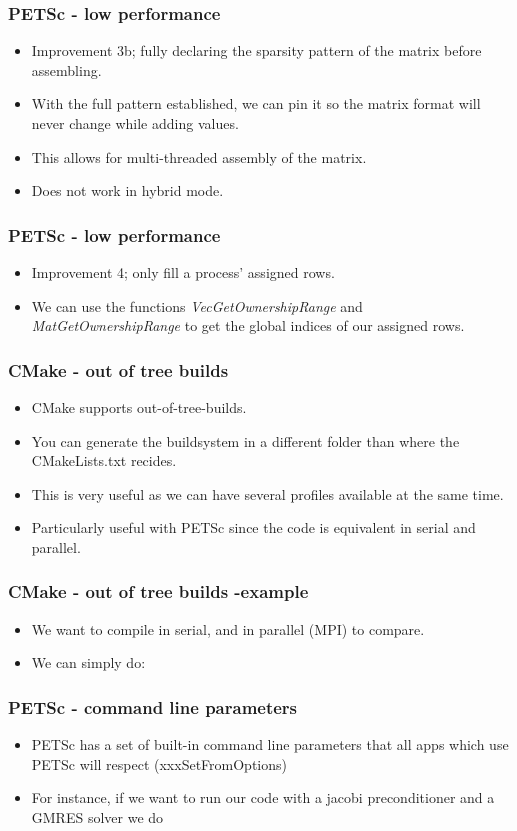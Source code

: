 \documentclass{beamer}
\begin{document}
\begin{frame}\frametitle{PETSc - low performance}
  \begin{itemize}
    \item Improvement 3b; fully declaring the sparsity pattern of the matrix 
          before assembling.
          
    \item With the full pattern established, we can pin it so the matrix
          format will never change while adding values.
    \item This allows for multi-threaded assembly of the matrix.
    \item Does not work in hybrid mode.
  \end{itemize}
\end{frame}
\begin{frame}\frametitle{PETSc - low performance}
  \begin{itemize}
    \item Improvement 4; only fill a process' assigned rows.
    \item We can use the functions \emph{VecGetOwnershipRange} and 
          \emph{MatGetOwnershipRange} to get the global indices of
          our assigned rows.
  \end{itemize}
\end{frame}
\begin{frame}\frametitle{CMake - out of tree builds}
  \begin{itemize}
    \item CMake supports out-of-tree-builds.
    \item You can generate the buildsystem in a different folder than where
          the CMakeLists.txt recides.
    \item This is very useful as we can have several profiles available at
          the same time.
    \item Particularly useful with PETSc since the code is equivalent in serial
          and parallel.
  \end{itemize}
\end{frame}
\begin{frame}\frametitle{CMake - out of tree builds -example}
  \begin{itemize}
    \item We want to compile in serial, and in parallel (MPI) to compare.
    \item We can simply do:
        
  \end{itemize}
\end{frame}
\begin{frame}\frametitle{PETSc - command line parameters}
  \begin{itemize}
    \item PETSc has a set of built-in command line parameters that all
        apps which use PETSc will respect (xxxSetFromOptions)
    \item For instance, if we want to run our code with a jacobi preconditioner
          and a GMRES solver we do
          
  \end{itemize}
\end{frame}
\end{document}
